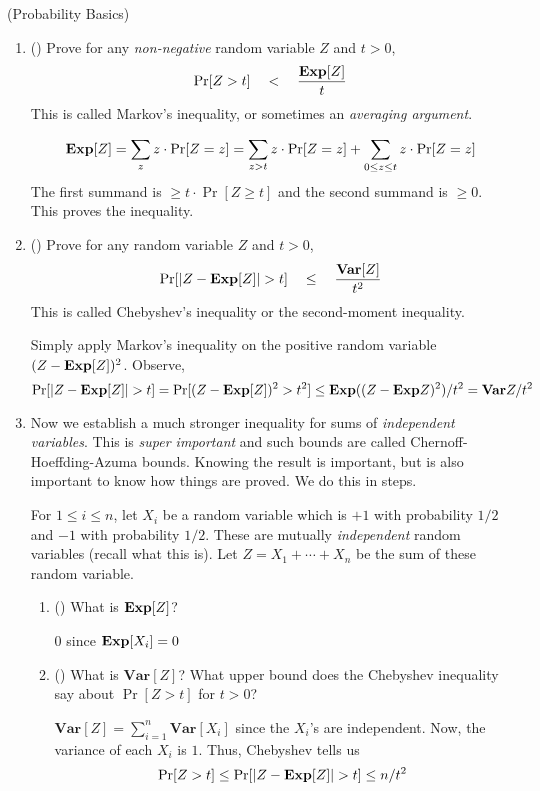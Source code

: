 \documentclass[11pt]{article}
\newcommand{\solution}[1]{\noindent {\color{blue} {\bf Solution:}} {\color{gray} {#1}}}
\newcommand{\solution}[1]{\ignore{#1}}
\begin{document}
\vspace{2ex}
\begin{exercise}(Probability Basics)
	\begin{enumerate}
		\item (\Coffeecup) Prove for any {\em non-negative} random variable $Z$ and $t > 0$,
		\[
		\Pr[Z > t] \quad < \quad \frac{\mathbf{Exp}[Z]}{t}
		\]
		This is called Markov's inequality, or sometimes an {\em averaging argument}.
		
		\solution{
			\[
			\mathbf{Exp}[Z] = \sum_{z} z\cdot \Pr[Z = z] =  \sum_{z > t} z\cdot \Pr[Z = z] + \sum_{0\leq z \le t}  z\cdot \Pr[Z = z] 
			\]
			The first summand is $\geq t\cdot \Pr[Z \geq t]$ and the second summand is $\geq 0$. This proves the inequality.
		}
	
		\item (\Coffeecup) Prove for any random variable $Z$ and $t > 0$, 
		\[
		\Pr[|Z - \mathbf{Exp}[Z]| > t] \quad \leq \quad \frac{\mathbf{Var}[Z]}{t^2}
		\]
		This is called Chebyshev's inequality or the second-moment inequality.
		
		\solution{
			Simply apply Markov's inequality on the positive random variable $(Z - \mathbf{Exp}[Z])^2$.
			Observe,
			\[
\Pr[|Z - \mathbf{Exp}[Z]| > t] = \Pr[(Z - \mathbf{Exp}[Z])^2 > t^2] \leq \mathbf{Exp}((Z - \mathbf{Exp} Z)^2)/t^2 = \mathbf{Var}Z/t^2
			\]
		}
	
		\item 
		Now we establish a much stronger inequality for sums of {\em independent variables}. This is {\em super important} and such bounds are called Chernoff-Hoeffding-Azuma bounds. Knowing the result is important, but is also important to know how things are proved. We do this in steps.
		
		For $1\leq i\leq n$, let $X_i$ be a random variable which is $+1$ with probability $1/2$ and $-1$ with probability $1/2$.
		These are mutually {\em independent} random variables (recall what this is). Let $Z = X_1 + \cdots + X_n$ be the sum of these random variable.
		
		\begin{enumerate}
			\item (\Coffeecup) What is $\mathbf{Exp}[Z]$?
			
			\solution{$0$ since $\mathbf{Exp}[X_i] = 0$}
			
			\item (\Coffeecup) What is $\mathbf{Var}[Z]$? What upper bound does the Chebyshev inequality say about $\Pr[Z > t]$ for $t > 0$?
			
			\solution{
				$\mathbf{Var}[Z] = \sum_{i=1}^n \mathbf{Var}[X_i]$ since the $X_i$'s are independent.
				Now, the variance of each $X_i$ is $1$. Thus, Chebyshev tells us
				\[
				\Pr[Z > t] \leq \Pr[|Z - \mathbf{Exp}[Z]| > t] \leq n/t^2
				\]
			}
			

\end{enumerate}
\end{enumerate}
\end{exercise}
\end{document}
